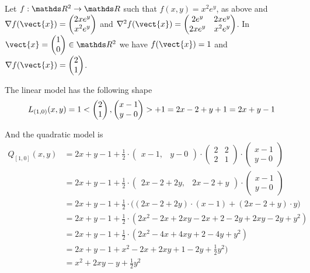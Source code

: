 \documentclass[computationalMathematics.tex]{subfiles}
\begin{document}
\begin{example}
	Let $f:\R^2 \to \R$ such that $f(x, y) = x^2 e^y$, as above and $\nabla f(\vect{x})=\begin{pmatrix}
	2x e^y\\
	x^2 e^y
	\end{pmatrix}$ and $\nabla^2 f(\vect{x}) =	\begin{pmatrix}
	2 e^y & 2x e^y\\
	2x e^y & x^2 e^y\\
	\end{pmatrix}$.
	In $\vect{x} = \begin{pmatrix}1\\0\end{pmatrix} \in \R^2$ we have $f(\vect{x}) = 1$ and $\nabla f(\vect{x}) = \begin{pmatrix}2\\1\end{pmatrix}$.
	
	The linear model has the following shape 
	\[
	L_{(1, 0)} (x, y) = 1<\begin{pmatrix}2\\ 1\end{pmatrix}, \begin{pmatrix} x-1\\ y-0\end{pmatrix}> + 1= 2x -  2 + y + 1 = 2x + y -1
	\]
	
	And the quadratic model is 
	\begin{equation}
	\begin{split}
	Q_{[1, 0]} (x, y) &= 2x + y -1 + \frac{1}{2} \cdot \begin{pmatrix}x-1, & y-0\end{pmatrix} \cdot \begin{pmatrix} 2 & 2\\ 2 & 1 \end{pmatrix} \cdot \begin{pmatrix} x-1 \\ y-0 \end{pmatrix}\\ 
	&= 2x + y -1 + \frac{1}{2} \cdot \begin{pmatrix} 2x -2 +2y, & 2x -2 +y \end{pmatrix} \cdot \begin{pmatrix} x-1\\ y-0\end{pmatrix}\\
	&= 2x + y -1 + \frac{1}{2} \cdot \biggl ( (2x -2 + 2y) \cdot (x-1)  + (2x -2 +y) \cdot y \biggr )\\
	&= 2x + y -1 + \frac{1}{2} \cdot (2 x^2 - 2x + 2xy -2x +2 -2y +2xy -2y +y^2)\\
	&= 2x +y -1 + \frac{1}{2} \cdot (2 x^2 -4x + 4xy +2 -4y + y^2)\\
	&= 2x +y -1 + x^2 -2x + 2xy +1 -2y + \frac{1}{2}y^2)\\
	&= x^2 + 2xy -y + \frac{1}{2}y^2\\	
	\end{split}
	\end{equation}
\end{example}
\end{document}
